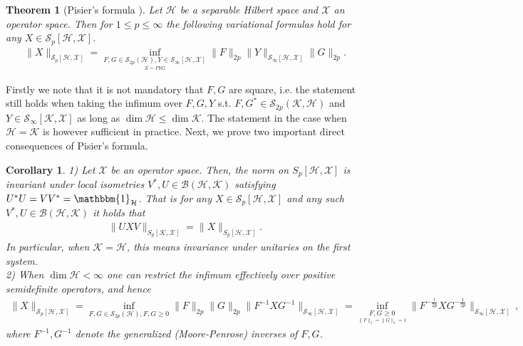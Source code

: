 \documentclass[11pt]{article}
\newcommand{\1}{\ensuremath{\mathbbm{1}}}
\theoremstyle{newdefinition}
\theoremstyle{newplain}
\newtheorem{theorem}[definition]{Theorem}
\newtheorem{corollary}[definition]{Corollary}
\theoremstyle{myplain}
\begin{document}
\begin{theorem}[Pisier's formula \cite{Book.Pisier.1998}] \label{thm:PisierOriginal}
Let $\mathcal{H}$ be a separable Hilbert space and $\mathcal{X}$ an operator space. Then for $1\leq p\leq\infty$ the following variational formulas hold for any $X\in \mathcal{S}_p[\mathcal{H},\mathcal{X}]$.
\begin{align}
    \|X\|_{\mathcal{S}_p[\mathcal{H},\mathcal{X}]}= \inf_{\underset{X=FYG}{F,G\in \mathcal{S}_{2p}(\mathcal{H}), Y\in \mathcal{S}_\infty[\mathcal{H},\mathcal{X}]}}\|F\|_{2p}\|Y\|_{\mathcal{S}_\infty[\mathcal{H},\mathcal{X}]}\|G\|_{2p}.
\end{align}
\end{theorem}
Firstly we note that it is not mandatory that $F,G$ are square, i.e. the statement still holds when taking the infimum over $F,G,Y$ s.t. $F,G^*\in\mathcal{S}_{2p}(\mathcal{K},\mathcal{H})$ and $Y\in\mathcal{S}_\infty[\mathcal{K},\mathcal{X}]$ as long as $\dim\mathcal{H}\leq \dim\mathcal{K}$. The statement in the case when $\mathcal{H}=\mathcal{K}$ is however sufficient in practice. Next, we prove two important direct consequences of Pisier's formula.
\begin{corollary}\label{cor:Pisier.Formula}
1) Let $\mathcal{X}$ be an operator space. Then, the norm on $S_p[\mathcal{H},\mathcal{X}]$ is invariant under local isometries $V^*,U\in\mathcal{B}(\mathcal{H},\mathcal{K})$ satisfying $U^*U=VV^*=\1_\mathcal{H}$. That is for any $X\in\mathcal{S}_{p}[\mathcal{H},\mathcal{X}]$ and any such $V^*,U\in\mathcal{B}(\mathcal{H},\mathcal{K})$ it holds that %
\begin{align}
    \|UXV\|_{S_p[\mathcal{K},\mathcal{X}]} =    \|X\|_{S_p[\mathcal{H},\mathcal{X}]}.
\end{align}
In particular, when $\mathcal{K}=\mathcal{H}$, this means invariance under unitaries on the first system. \\
2) When $\dim\mathcal{H}<\infty$ one can restrict the infimum effectively over positive semidefinite operators, and hence
\begin{align}
\|X\|_{\mathcal{S}_p[\mathcal{H},\mathcal{X}]}=\inf_{F,G\in\mathcal{S}_{2p}(\mathcal{H}), F,G\geq0}\|F\|_{2p}\|G\|_{2p}\|F^{-1}XG^{-1}\|_{\mathcal{S}_\infty[\mathcal{H},\mathcal{X}]}=
\inf_{\underset{\|F\|_1=\|G\|_1=1}{F,G\ge 0}}\|F^{-\frac{1}{2p}}XG^{-\frac{1}{2p}}\|_{\mathcal{S}_\infty[\mathcal{H},\mathcal{X}]}\,,
\end{align}
where $F^{-1},G^{-1}$ denote the generalized (Moore-Penrose) inverses of $F,G$. 
\end{corollary}
\end{document}
